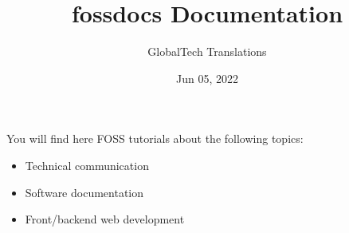 \documentclass[a4paper,10pt,english,openany,oneside]{sphinxmanual}
\title{fossdocs Documentation}
\date{Jun 05, 2022}
\author{GlobalTech Translations}
\begin{document}
\pagestyle{empty}
\sphinxmaketitle
\pagestyle{plain}
\sphinxtableofcontents
\pagestyle{normal}
\label{\detokenize{index::doc}}


\sphinxAtStartPar
You will find here FOSS tutorials about the following topics:
\begin{itemize}
\item {} 
\sphinxAtStartPar
Technical communication

\item {} 
\sphinxAtStartPar
Software documentation

\item {} 
\sphinxAtStartPar
Front/backend web development

\end{itemize}

\sphinxAtStartPar
{}
\end{document}
